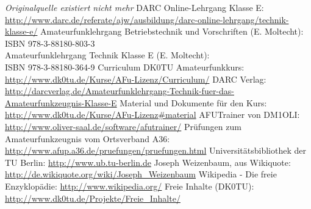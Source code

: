 \begin{thebibliography}{}
      \emph{Originalquelle existiert nicht mehr}
      DARC Online-Lehrgang Klasse E:
                    \url{http://www.darc.de/referate/ajw/ausbildung/darc-online-lehrgang/technik-klasse-e/}
     Amateurfunklehrgang Betriebstechnik und Vorschriften (E. Moltecht): \\
                    ISBN 978-3-88180-803-3 \\
                    Amateurfunklehrgang Technik Klasse E (E. Moltecht): \\
                    ISBN 978-3-88180-364-9
      Curriculum DK0TU Amateurfunkkurs: \\
                    \url{http://www.dk0tu.de/Kurse/AFu-Lizenz/Curriculum/}
     DARC Verlag:
                    \url{http://darcverlag.de/Amateurfunklehrgang-Technik-fuer-das-Amateurfunkzeugnis-Klasse-E}
       Material und Dokumente für den Kurs:
                    \url{http://www.dk0tu.de/Kurse/AFu-Lizenz#material}
      AFUTrainer von DM1OLI:
                    \url{http://www.oliver-saal.de/software/afutrainer/}
      Prüfungen zum Amateurfunkzeugnis vom Ortsverband A36:
                    \url{http://www.afup.a36.de/pruefungen/pruefungen.html}
        Universitätsbibliothek der TU Berlin:
                    \url{http://www.ub.tu-berlin.de}
     Joseph Weizenbaum, aus Wikiquote:
                    \url{http://de.wikiquote.org/wiki/Joseph_Weizenbaum}
        Wikipedia - Die freie Enzyklopädie:
                    \url{http://www.wikipedia.org/}
        Freie Inhalte (DK0TU):
                    \url{http://www.dk0tu.de/Projekte/Freie_Inhalte/}
\end{thebibliography} 


